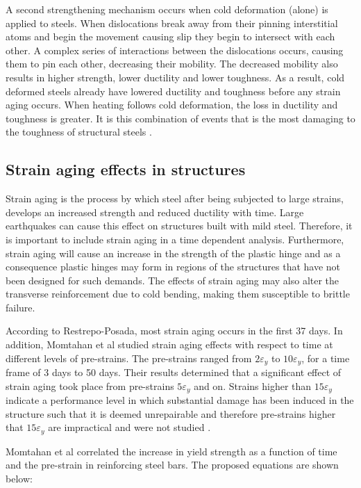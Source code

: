 A second strengthening mechanism occurs when cold deformation (alone) is applied to steels. When dislocations break away from their pinning interstitial atoms and begin the movement causing slip they begin to intersect with each other. A complex series of interactions between the dislocations occurs, causing them to pin each other, decreasing their mobility. The decreased mobility also results in higher strength, lower ductility and lower toughness. As a result, cold deformed steels already have lowered ductility and toughness before any strain aging occurs. When heating follows cold deformation, the loss in ductility and toughness is greater. It is this combination of events that is the most damaging to the toughness of structural steels \cite{Momtahan2009}.

\subsection{Strain aging effects in structures}

Strain aging is the process by which steel after being subjected to large strains, develops an increased strength and reduced ductility with time. Large earthquakes can cause this effect on structures built with mild steel. Therefore, it is  important to include strain aging in a time dependent analysis. Furthermore, strain aging will cause an increase in the strength of the plastic hinge and as a consequence plastic hinges may form in regions of the structures that have not been designed for such demands. The effects of strain aging may also alter the transverse reinforcement due to cold bending, making them susceptible to brittle failure\cite{Momtahan2009}.

According to Restrepo-Posada\cite{Restrepo-Posada1994}, most strain aging occurs in the first 37 days. In addition, Momtahan et al  \cite{Momtahan2009} studied strain aging effects with respect to time at different levels of pre-strains. The pre-strains ranged from $2\varepsilon_y $ to $10\varepsilon_y$, for a time frame of 3 days to 50 days. Their results determined that a significant effect of strain aging took place from pre-strains $5\varepsilon_y$ and on. Strains higher than $15\varepsilon_y$ indicate a performance level in which substantial damage has been induced in the structure such that it is deemed unrepairable and therefore pre-strains higher that $15\varepsilon_y$ are impractical and were not studied \cite{Momtahan2009}.

Momtahan et al correlated the increase in yield strength as a function of time and the pre-strain in reinforcing steel bars. The proposed equations are shown below:


